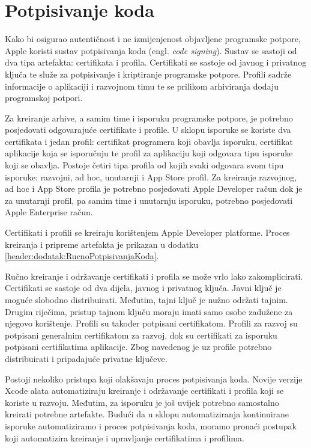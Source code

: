 \documentclass[times, utf8, diplomski, numeric]{fer}
\newcommand{\eng}[1]{(engl. \textit{#1})}
\begin{document}
\section{Potpisivanje koda} \label{header:PotpisivanjeKoda}

Kako bi osigurao autentičnost i ne izmijenjenost objavljene programske potpore, Apple koristi sustav potpisivanja koda \eng{code signing}. Sustav se sastoji od dva tipa artefakta: certifikata i profila. Certifikati se sastoje od javnog i privatnog ključa te služe za potpisivanje i kriptiranje programske potpore. Profili sadrže informacije o aplikaciji i razvojnom timu te se prilikom arhiviranja dodaju programskoj potpori.

Za kreiranje arhive, a samim time i isporuku programske potpore, je potrebno posjedovati odgovarajuće certifikate i profile. U sklopu isporuke se koriste dva certifikata i jedan profil: certifikat programera koji obavlja isporuku, certifikat aplikacije koja se isporučuju te profil za aplikaciju koji odgovara tipu isporuke koji se obavlja\citep{codesigning}. Postoje četiri tipa profila od kojih svaki odgovara svom tipu isporuke: razvojni, ad hoc, unutarnji i App Store profil. Za kreiranje razvojnog, ad hoc i App Store profila je potrebno posjedovati Apple Developer račun dok je za unutarnji profil, pa samim time i unutarnju isporuku, potrebno posjedovati Apple Enterprise račun.

Certifikati i profili se kreiraju korištenjem Apple Developer platforme. Proces kreiranja i pripreme artefakta je prikazan u dodatku \ref{header:dodatak:RucnoPotpisivanjaKoda}.

Ručno kreiranje i održavanje certifikati i profila se može vrlo lako zakomplicirati. Certifikati se sastoje od dva dijela, javnog i privatnog ključa. Javni ključ je moguće slobodno distribuirati. Međutim, tajni ključ je nužno održati tajnim. Drugim riječima, pristup tajnom ključu moraju imati samo osobe zadužene za njegovo korištenje. Profili su također potpisani certifikatom. Profili za razvoj su potpisani generalnim certifikatom za razvoj, dok su certifikati za isporuku potpisani certifikatima aplikacije. Zbog navedenog je uz profile potrebno distribuirati i pripadajuće privatne ključeve.

Postoji nekoliko pristupa koji olakšavaju proces potpisivanja koda. Novije verzije Xcode alata automatiziraju kreiranje i održavanje certifikati i profila koji se koriste u razvoju. Međutim, za isporuku je još uvijek potrebno samostalno kreirati potrebne artefakte. Budući da u sklopu automatiziranja kontinuirane isporuke automatiziramo i proces potpisivanja koda, moramo pronaći postupak koji automatizira kreiranje i upravljanje certifikatima i profilima.
\end{document}
